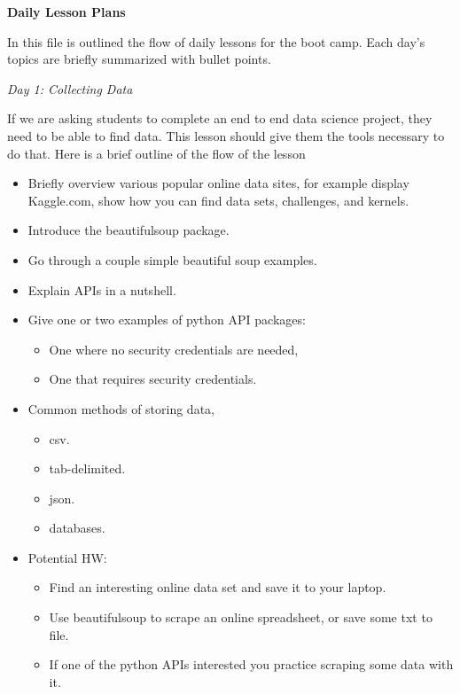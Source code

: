 \documentclass[12pt]{article}
\begin{document}
	\noindent
	\textbf{\Large{Daily Lesson Plans}}
	
	\vspace{4mm}
	\noindent
	In this file is outlined the flow of daily lessons for the boot camp. Each day's topics are briefly summarized with bullet points.
	
	
	\vspace{4mm}
	\noindent
	\textit{\large{Day 1: Collecting Data}}
	
	\noindent
	If we are asking students to complete an end to end data science project, they need to be able to find data. This lesson should give them the tools necessary to do that. Here is a brief outline of the flow of the lesson
	\begin{itemize}
		\item Briefly overview various popular online data sites, for example display Kaggle.com, show how you can find data sets, challenges, and kernels.
		\item Introduce the beautifulsoup package.
		\item Go through a couple simple beautiful soup examples.
		\item Explain APIs in a nutshell.
		\item Give one or two examples of python API packages:
			\begin{itemize}
				\item One where no security credentials are needed,
				\item One that requires security credentials.
			\end{itemize}
		\item Common methods of storing data,
			\begin{itemize}
				\item csv.
				\item tab-delimited.
				\item json.
				\item databases.
			\end{itemize}
		\item Potential HW:
			\begin{itemize}
				\item Find an interesting online data set and save it to your laptop.
				\item Use beautifulsoup to scrape an online spreadsheet, or save some txt to file.
				\item If one of the python APIs interested you practice scraping some data with it.
			\end{itemize}
	\end{itemize}
	
\end{document}
